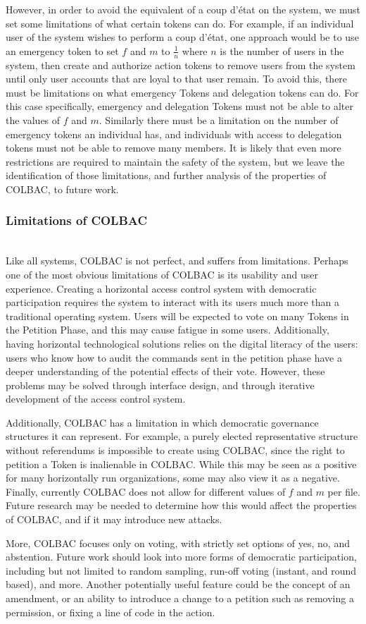 However, in order to avoid the equivalent of a coup d'\'etat on the system, we
must set some limitations of what certain tokens can do. For example, if an 
individual user of the system wishes to perform a coup d'\'etat, one approach
would be to use an emergency token to set $f$ and $m$ to $\frac{1}{n}$ where $n$
is the number of users in the system, then create and authorize action tokens to
remove users from the system until only user accounts that are loyal to that
user remain. To avoid this, there must be limitations on what emergency Tokens
and delegation tokens can do. For this case specifically, emergency and
delegation Tokens must not be able to alter the values of $f$ and $m$. Similarly
there must be a limitation on the number of emergency tokens an individual has,
and individuals with access to delegation tokens must not be able to remove many
members. It is likely that even more restrictions are required to maintain the
safety of the system, but we leave the identification of those limitations, and
further analysis of the properties of COLBAC, to future work.

\subsubsection{Limitations of COLBAC}
\label{sec:colbaclimitations}
\mbox{}\\
Like all systems, COLBAC is not perfect, and suffers from limitations. Perhaps
one of the most obvious limitations of COLBAC is its usability and user
experience. Creating a horizontal access control system with democratic
participation requires the system to interact with its users much more than a
traditional operating system. Users will be expected to vote on many Tokens in
the Petition Phase, and this may cause fatigue in some users. Additionally, 
having horizontal technological solutions relies on the digital literacy of the
users: users who know how to audit the commands sent in the petition phase have
a deeper understanding of the potential effects of their vote. However, these
problems may be solved through interface design, and through iterative
development of the access control system.

Additionally, COLBAC has a limitation in which democratic governance structures
it can represent. For example, a purely elected representative structure without
referendums is impossible to create using COLBAC, since the right to petition
a Token is inalienable in COLBAC. While this may be seen as a positive for many
horizontally run organizations, some may also view it as a negative. Finally,
currently COLBAC does not allow for different values of $f$ and $m$ per file.
Future research may be needed to determine how this would affect the properties
of COLBAC, and if it may introduce new attacks.

More, COLBAC focuses only on voting, with strictly set options of yes, no, and
abstention. Future work should look into more forms of democratic participation,
including but not limited to random sampling, run-off voting (instant, and
round based), and more. Another potentially useful feature could be the concept
of an amendment, or an ability to introduce a change to a petition such as
removing a permission, or fixing a line of code in the action.
